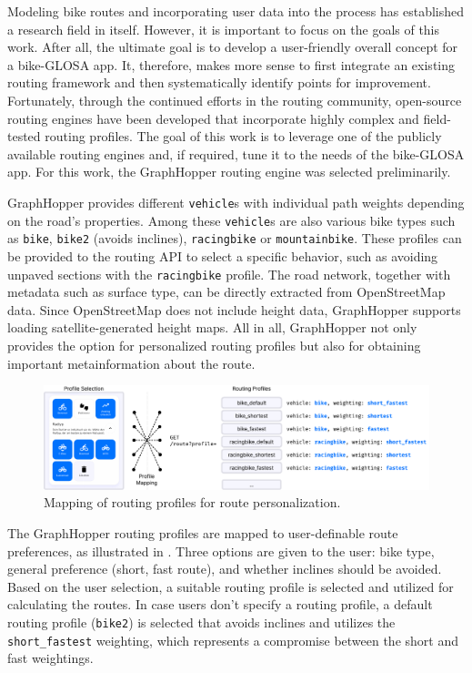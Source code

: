 Modeling bike routes and incorporating user data into the process has established a research field in itself. However, it is important to focus on the goals of this work. After all, the ultimate goal is to develop a user-friendly overall concept for a bike-GLOSA app. It, therefore, makes more sense to first integrate an existing routing framework and then systematically identify points for improvement. Fortunately, through the continued efforts in the routing community, open-source routing engines have been developed that incorporate highly complex and field-tested routing profiles. The goal of this work is to leverage one of the publicly available routing engines and, if required, tune it to the needs of the bike-GLOSA app. For this work, the GraphHopper routing engine was selected preliminarily.

GraphHopper provides different \texttt{vehicle}s with individual path weights depending on the road's properties. Among these \texttt{vehicle}s are also various bike types such as \texttt{bike}, \texttt{bike2} (avoids inclines), \texttt{racingbike} or \texttt{mountainbike}. These profiles can be provided to the routing API to select a specific behavior, such as avoiding unpaved sections with the \texttt{racingbike} profile. The road network, together with metadata such as surface type, can be directly extracted from OpenStreetMap data. Since OpenStreetMap does not include height data, GraphHopper supports loading satellite-generated height maps. All in all, GraphHopper not only provides the option for personalized routing profiles but also for obtaining important metainformation about the route.

\begin{figure}[htbp]
\centering
\includegraphics[width=\linewidth]{images/routing-profile-mapping.pdf}
\caption{Mapping of routing profiles for route personalization.}
\label{fig:routing-profile-mapping}
\end{figure}

The GraphHopper routing profiles are mapped to user-definable route preferences, as illustrated in . Three options are given to the user: bike type, general preference (short, fast route), and whether inclines should be avoided. Based on the user selection, a suitable routing profile is selected and utilized for calculating the routes. In case users don't specify a routing profile, a default routing profile (\texttt{bike2}) is selected that avoids inclines and utilizes the \texttt{short\_fastest} weighting, which represents a compromise between the short and fast weightings.

